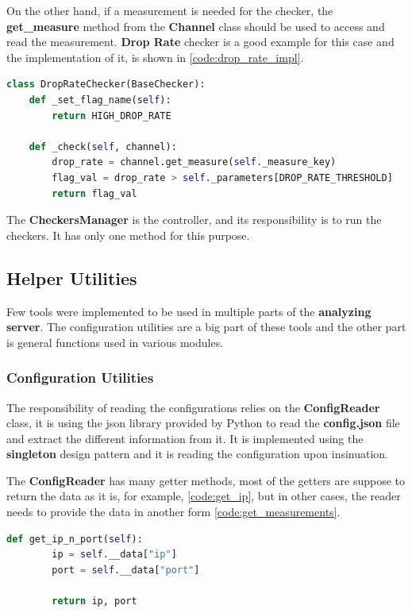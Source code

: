 On the other hand, if a measurement is needed for the checker, the \textbf{get\_measure} method from the 
\textbf{Channel} class should be used to access and read the measurement. \textbf{Drop Rate} checker is 
a good example for this case and the implementation of it, is shown in \ref{code:drop_rate_impl}.
\newline
\begin{lstlisting}[language=Python,label={code:drop_rate_impl}, caption={Drop Rate checker's implementation},captionpos=b]
class DropRateChecker(BaseChecker):
	def _set_flag_name(self):
        return HIGH_DROP_RATE

    def _check(self, channel):
        drop_rate = channel.get_measure(self._measure_key)
        flag_val = drop_rate > self._parameters[DROP_RATE_THRESHOLD]
        return flag_val
\end{lstlisting}

The \textbf{CheckersManager} is the controller, and its responsibility is to run the checkers. It has
only one method for this purpose.

\subsection{Helper Utilities}
Few tools were implemented to be used in multiple parts of the \textbf{analyzing server}. The
configuration utilities are a big part of these tools and the other part is general functions used in
various modules.

\subsubsection{Configuration Utilities}\label{sec:config_utils}
The responsibility of reading the configurations relies on the \textbf{ConfigReader} class, it is using
the json library provided by Python to read the \textbf{config.json} file and extract the different
information from it. It is implemented using the \textbf{singleton} design pattern and it is reading the
configuration upon insinuation.

The \textbf{ConfigReader} has many getter methods, most of the getters are suppose to return the data as 
it is, for example, \ref{code:get_ip}, but in other cases, the reader needs to provide the data in another 
form \ref{code:get_measurements}.
\newline
\begin{lstlisting}[language=Python,label={code:get_ip}, caption={Simple getter in ConfigReader},captionpos=b]
	def get_ip_n_port(self):
		ip = self.__data["ip"]
		port = self.__data["port"]
	
		return ip, port
\end{lstlisting}

